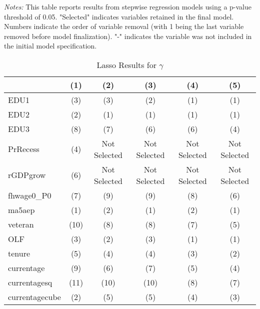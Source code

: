 \documentclass[12pt]{article}
\begin{document}
\begin{table}[H]
\begin{tabular}{lccccc}
\bottomrule
\end{tabular}%
\newline

\footnotesize
\textit{Notes:} This table reports results from stepwise regression models using a p-value threshold of 0.05. "Selected" indicates variables retained in the final model. Numbers indicate the order of variable removal (with 1 being the last variable removed before model finalization). "-" indicates the variable was not included in the initial model specification.

\end{table}





\begin{table}[H]
\centering
\caption{Lasso Results for $\gamma$}

\begin{tabular}{lccccc}

\toprule
                    & (1)     & (2)   & (3)    & (4)      & (5)         \\

\midrule
EDU1                &  (3)  &  (3)    &  (2)  &  (1)   &  (1)    \\
EDU2                &  (2)  &  (1)    &  (1)  &  (1)   &  (1)    \\
EDU3                &  (8)  &  (7)    &  (6)  &  (6)   &  (4)    \\
PrRecess            &  (4)   & Not Selected    & Not Selected   & Not Selected    & Not Selected     \\
rGDPgrow            &  (6)   & Not Selected     & Not Selected   & Not Selected    & Not Selected     \\
fhwage0\_P0         &  (7)   &  (9)     &  (9)   &  (8)    &  (6)     \\
ma5aep              &  (1)   &  (2)     &  (1)   &  (2)    &  (1)     \\
veteran             &  (10)   &  (8)     &  (8)   &  (7)    &  (5)     \\
OLF                 &  (3)   &  (2)     &  (3)   &  (1)    &  (1)     \\
tenure              &  (5)   &  (4)     &  (4)   &  (3)    &  (2)     \\
currentage          &  (9)   &  (6)     &  (7)   &  (5)    &  (4)     \\
currentagesq        &  (11)  &  (10)    &  (10)  &  (8)   &  (7)    \\
currentagecube      &  (2)  &  (5)    &  (5)  &  (4)   &  (3)    \\


\end{tabular}
\end{table}
\end{document}
